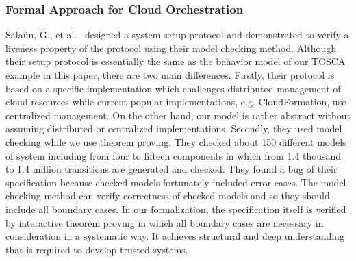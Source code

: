\documentclass[12pt]{report}
\begin{document}
\subsubsection{Formal Approach for Cloud Orchestration}
Sala{\"u}n, G., et
al.~\cite{EtcheversCBP11,SalaunBCPEG13,SalaunEPBC13} designed a system
setup protocol and demonstrated to verify a liveness property of the
protocol using their model checking method. Although their setup
protocol is essentially the same as the behavior model of our TOSCA
example in this paper, there are two main differences. Firstly, their
protocol is based on a specific implementation which challenges
distributed management of cloud resources while current popular
implementations, e.g. CloudFormation, use centralized management. On
the other hand, our model is rather abstract without assuming
distributed or centralized implementations. Secondly, they used model
checking while we use theorem proving. They checked about 150
different models of system including from four to fifteen components
in which from 1.4 thousand to 1.4 million transitions are generated
and checked. They found a bug of their specification because checked
models fortunately included error cases. The model checking method can
verify correctness of checked models and so they should include all
boundary cases. In our formalization, the specification itself is
verified by interactive theorem proving in which all boundary cases
are necessary in consideration in a systematic way. It achieves
structural and deep understanding that is required to develop trusted
systems.

\end{document}
